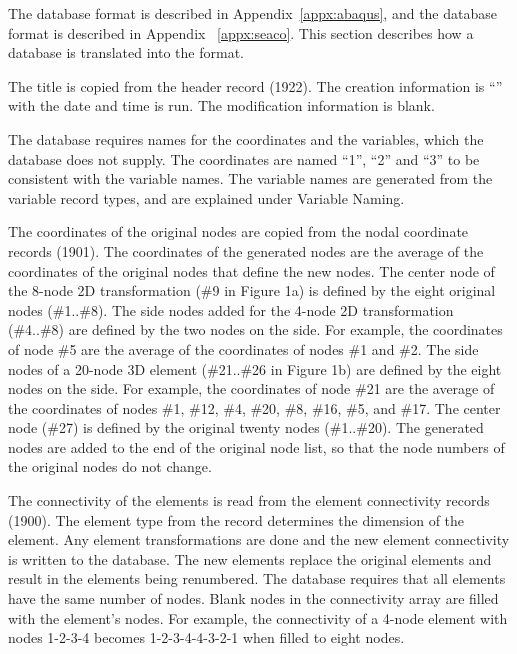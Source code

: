 The  database format is described in
Appendix~\ref{appx:abaqus}, and the  database format is
described in Appendix ~\ref{appx:seaco}. This section describes how a
 database is translated into the  format.

The  title is copied from the  header record
(1922). The creation information is ``\caps{\PROGRAM}'' with the date
and time \caps{\PROGRAM} is run. The modification information is blank.

The  database requires names for the coordinates and the
variables, which the  database does not supply. The
coordinates are named ``1'', ``2'' and ``3'' to be consistent with the
variable names. The variable names are generated from the variable
record types, and are explained under Variable Naming.

The coordinates of the original nodes are copied from the 
nodal coordinate records (1901). The coordinates of the generated nodes
are the average of the coordinates of the original nodes that define the
new nodes. The center node of the 8-node 2D transformation (\#9 in
Figure 1a) is defined by the eight original nodes (\#1..\#8). The side
nodes added for the 4-node 2D transformation (\#4..\#8) are defined by
the two nodes on the side. For example, the coordinates of node \#5 are
the average of the coordinates of nodes \#1 and \#2. The side nodes of a
20-node 3D element (\#21..\#26 in Figure 1b) are defined by the eight
nodes on the side. For example, the coordinates of node \#21 are the
average of the coordinates of nodes \#1, \#12, \#4, \#20, \#8, \#16,
\#5, and \#17. The center node (\#27) is defined by the original twenty
nodes (\#1..\#20). The generated nodes are added to the end of the
original node list, so that the node numbers of the original nodes do
not change.

The connectivity of the elements is read from the  element
connectivity records (1900). The element type from the record determines
the dimension of the element. Any element transformations are done and
the new element connectivity is written to the  database.
The new elements replace the original elements and result in the
elements being renumbered. The  database requires that all
elements have the same number of nodes. Blank nodes in the connectivity
array are filled with the element's nodes. For example, the connectivity
of a 4-node element with nodes 1-2-3-4 becomes 1-2-3-4-4-3-2-1 when
filled to eight nodes.

